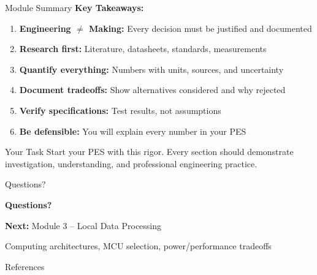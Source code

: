 \documentclass[aspectratio=169,11pt]{beamer}
\begin{document}
\begin{frame}{Module Summary}
    \textbf{Key Takeaways:}
    
    \vspace{0.3cm}
    \begin{enumerate}
        \item \textbf{Engineering $\neq$ Making:} Every decision must be justified and documented
        \item \textbf{Research first:} Literature, datasheets, standards, measurements
        \item \textbf{Quantify everything:} Numbers with units, sources, and uncertainty
        \item \textbf{Document tradeoffs:} Show alternatives considered and why rejected
        \item \textbf{Verify specifications:} Test results, not assumptions
        \item \textbf{Be defensible:} You will explain every number in your PES
    \end{enumerate}
    
    \vspace{0.3cm}
    \begin{block}{Your Task}
        Start your PES with this rigor. Every section should demonstrate investigation, understanding, and professional engineering practice.
    \end{block}
\end{frame}

\begin{frame}{Questions?}
    \begin{center}
        \Large
        \textbf{Questions?}
        
        \vspace{1cm}
        \normalsize
        \textbf{Next:} Module 3 -- Local Data Processing
        
        \vspace{0.5cm}
        Computing architectures, MCU selection, power/performance tradeoffs
    \end{center}
\end{frame}


\begin{frame}[allowframebreaks]{References}
    \printbibliography
\end{frame}
\end{document}
